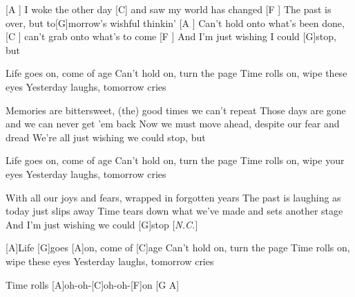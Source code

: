 

\begin{guitar}
	[A ] I woke the other day [C] and saw my world has changed
	[F ] The past is over, but to[G]morrow's wishful thinkin'
	[A ] Can't hold onto what's been done, [C ] can't grab onto what's to come
	[F ] And I'm just wishing I could [G]stop, but
	
	Life goes on, come of age
	Can't hold on, turn the page
	Time rolls on, wipe these eyes
	Yesterday laughs, tomorrow cries
	
	Memories are bittersweet, (the) good times we can't repeat
	Those days are gone and we can never get 'em back
	Now we must move ahead, despite our fear and dread
	We're all just wishing we could stop, but
	
	Life goes on, come of age
	Can't hold on, turn the page
	Time rolls on, wipe your eyes
	Yesterday laughs, tomorrow cries

	With all our joys and fears, wrapped in forgotten years
	The past is laughing as today just slips away
	Time tears down what we've made and sets another stage
	And I'm just wishing we could [G]stop [\textit{N.C.}]{}
	
	[A]Life [G]goes [A]on, come of [C]age
	Can't hold on, turn the page
	Time rolls on, wipe these eyes
	Yesterday laughs, tomorrow cries
	
	Time rolls [A]oh-oh-[C]oh-oh-[F]on [G A]{}\hfill\end{guitar}
